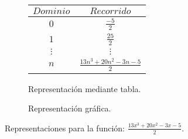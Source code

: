 \begin{figure}[h]
\centering
\begin{subfigure}[A]{0.3\textwidth}
\centering
\begin{tabular}{c|c}
$Dominio$ & $Recorrido$ \\ \hline
\hline
$0$ & $\frac{-5}{2}$ \\ \hline
$1$ & $\frac{25}{2}$ \\ \hline
$\vdots$ & $\vdots$ \\ \hline
$n$& $\frac{13 n^3 + 20 n^2 -3 n -5}{2}$ \\ \hline
\end{tabular} 
\caption{Representación mediante tabla.}

\end{subfigure}%
\quad
\begin{subfigure}[B]{0.3\textwidth}
\centering



\caption{Representación gráfica.}

\end{subfigure}

\caption{Representaciones para la función: $\frac{13 x^3 + 20 x^2 -3 x -5}{2}$.}

\end{figure}

